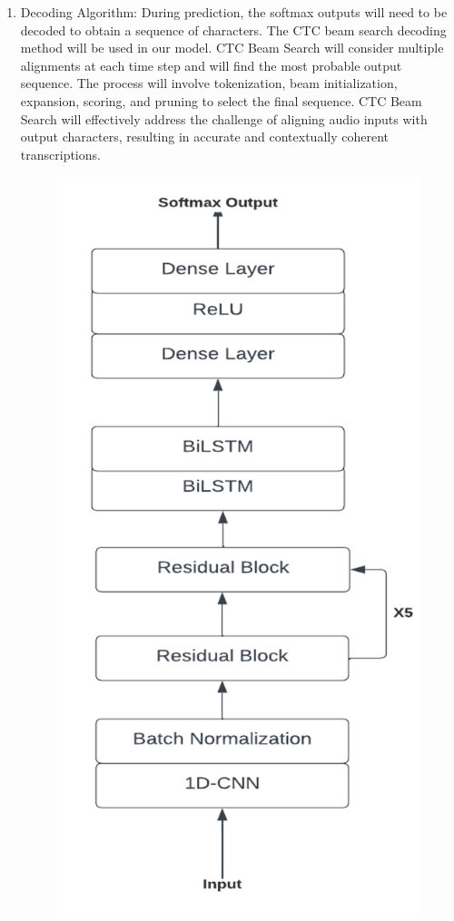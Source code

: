 \begin{enumerate}
	
		\item  Decoding Algorithm: During prediction, the softmax outputs will need to be decoded to obtain a sequence of characters. The CTC beam search decoding method will be used in our model. CTC Beam Search will consider multiple alignments at each time step and will find the most probable output sequence. The process will involve tokenization, beam initialization, expansion, scoring, and pruning to select the final sequence. CTC Beam Search will effectively address the challenge of aligning audio inputs with output characters, resulting in accurate and contextually coherent transcriptions.
		\begin{figure}[h!]
\centering
    \includegraphics[scale=0.8]{images/decoding.png}

\end{figure}
\end{enumerate}
